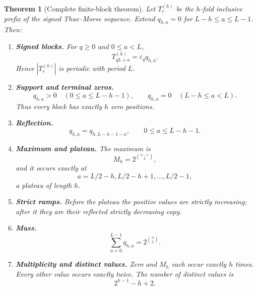 \documentclass[11pt,a4paper,oneside,openany]{book}
\numberwithin{equation}{chapter}
\newtheorem{theorem}{Theorem}[chapter]
\theoremstyle{definition}
\theoremstyle{remark}
\newcommand{\eps}{\varepsilon}
\newcommand{\Prefix}{T}
\begin{document}
\begin{theorem}[Complete finite-block theorem]\label{a:thm:finite-block}
Let \(\Prefix_r^{(h)}\) be the \(h\)-fold inclusive prefix of the signed
Thue--Morse sequence.  Extend \(q_{h,a}=0\) for
\(L-h\le a\le L-1\).  Then:

\begin{enumerate}
\item \textbf{Signed blocks.}  For \(q\ge0\) and \(0\le a<L\),
\begin{equation}
 \boxed{\Prefix_{qL+a}^{(h)}=\eps_q q_{h,a}.}
 \label{a:eq:general-signed-block}
\end{equation}
Hence \(|\Prefix_r^{(h)}|\) is periodic with period \(L\).

\item \textbf{Support and terminal zeros.}
\begin{equation}
 q_{h,a}>0\quad(0\le a\le L-h-1),
 \qquad
 q_{h,a}=0\quad(L-h\le a<L).
 \label{a:eq:general-support}
\end{equation}
Thus every block has exactly \(h\) zero positions.

\item \textbf{Reflection.}
\begin{equation}
 q_{h,a}=q_{h,L-h-1-a},
 \qquad 0\le a\le L-h-1.
 \label{a:eq:general-reflection}
\end{equation}

\item \textbf{Maximum and plateau.}  The maximum is
\begin{equation}
 M_h=2^{\binom{h-1}{2}},
 \label{a:eq:general-maximum}
\end{equation}
and it occurs exactly at
\begin{equation}
 a=L/2-h,L/2-h+1,\ldots,L/2-1,
 \label{a:eq:general-plateau}
\end{equation}
a plateau of length \(h\).

\item \textbf{Strict ramps.}  Before the plateau the positive values are
strictly increasing; after it they are their reflected strictly decreasing
copy.

\item \textbf{Mass.}
\begin{equation}
 \sum_{a=0}^{L-1}q_{h,a}=2^{\binom h2}.
 \label{a:eq:general-mass}
\end{equation}

\item \textbf{Multiplicity and distinct values.}  Zero and \(M_h\) each
occur exactly \(h\) times.  Every other value occurs exactly twice.  The
number of distinct values is
\begin{equation}
 \boxed{2^{h-1}-h+2.}
 \label{a:eq:general-distinct}
\end{equation}


\end{enumerate}
\end{theorem}
\end{document}
